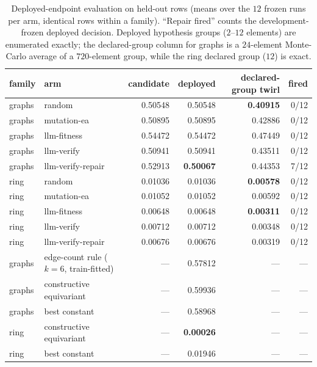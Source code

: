 \documentclass[11pt]{article}
\begin{document}
\begin{table}[t]
\centering
\caption{Deployed-endpoint evaluation on held-out rows (means over the $12$ frozen runs per
arm, identical rows within a family). ``Repair fired'' counts the development-frozen deployed
decision. Deployed hypothesis groups ($2$--$12$ elements) are enumerated exactly; the
declared-group column for graphs is a $24$-element Monte-Carlo average of a $720$-element
group, while the ring declared group ($12$) is exact.}
\label{tab:deployed}
\small
\begin{tabular}{@{}llrrrr@{}}
\toprule
family & arm & candidate & deployed & declared-group twirl & fired \\
\midrule
graphs & random            & 0.50548 & 0.50548 & \textbf{0.40915} & 0/12 \\
graphs & mutation-ea       & 0.50895 & 0.50895 & 0.42886 & 0/12 \\
graphs & llm-fitness       & 0.54472 & 0.54472 & 0.47449 & 0/12 \\
graphs & llm-verify        & 0.50941 & 0.50941 & 0.43511 & 0/12 \\
graphs & llm-verify-repair & 0.52913 & \textbf{0.50067} & 0.44353 & 7/12 \\
\midrule
ring & random            & 0.01036 & 0.01036 & \textbf{0.00578} & 0/12 \\
ring & mutation-ea       & 0.01052 & 0.01052 & 0.00592 & 0/12 \\
ring & llm-fitness       & 0.00648 & 0.00648 & \textbf{0.00311} & 0/12 \\
ring & llm-verify        & 0.00712 & 0.00712 & 0.00348 & 0/12 \\
ring & llm-verify-repair & 0.00676 & 0.00676 & 0.00319 & 0/12 \\
\midrule
graphs & edge-count rule ($k{=}6$, train-fitted) & --- & 0.57812 & --- & --- \\
graphs & constructive equivariant & --- & 0.59936 & --- & --- \\
graphs & best constant & --- & 0.58968 & --- & --- \\
ring & constructive equivariant & --- & \textbf{0.00026} & --- & --- \\
ring & best constant & --- & 0.01946 & --- & --- \\
\bottomrule
\end{tabular}
\end{table}
\end{document}
